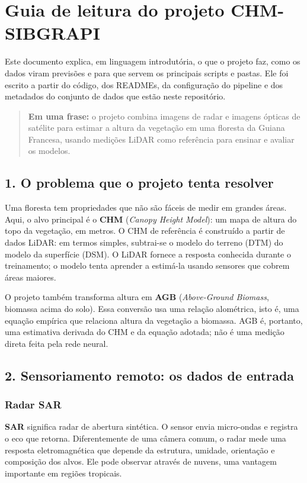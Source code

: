 \documentclass[11pt,a4paper]{article}
\begin{document}
\section{Guia de leitura do projeto CHM-SIBGRAPI}
Este documento explica, em linguagem introdutória, o que o projeto faz, como os dados viram previsões e para que servem os principais scripts e pastas. Ele foi escrito a partir do código, dos READMEs, da configuração do pipeline e dos metadados do conjunto de dados que estão neste repositório.

\begin{quote}\color{cinza}
\textbf{Em uma frase:} o projeto combina imagens de radar e imagens ópticas de satélite para estimar a altura da vegetação em uma floresta da Guiana Francesa, usando medições LiDAR como referência para ensinar e avaliar os modelos.\par
\end{quote}
\subsection{1. O problema que o projeto tenta resolver}
Uma floresta tem propriedades que não são fáceis de medir em grandes áreas. Aqui, o alvo principal é o \textbf{CHM} (\emph{Canopy Height Model}): um mapa de altura do topo da vegetação, em metros. O CHM de referência é construído a partir de dados LiDAR: em termos simples, subtrai-se o modelo do terreno (DTM) do modelo da superfície (DSM). O LiDAR fornece a resposta conhecida durante o treinamento; o modelo tenta aprender a estimá-la usando sensores que cobrem áreas maiores.

O projeto também transforma altura em \textbf{AGB} (\emph{Above-Ground Biomass}, biomassa acima do solo). Essa conversão usa uma relação alométrica, isto é, uma equação empírica que relaciona altura da vegetação a biomassa. AGB é, portanto, uma estimativa derivada do CHM e da equação adotada; não é uma medição direta feita pela rede neural.

\subsection{2. Sensoriamento remoto: os dados de entrada}
\subsubsection{Radar SAR}
\textbf{SAR} significa radar de abertura sintética. O sensor envia micro-ondas e registra o eco que retorna. Diferentemente de uma câmera comum, o radar mede uma resposta eletromagnética que depende da estrutura, umidade, orientação e composição dos alvos. Ele pode observar através de nuvens, uma vantagem importante em regiões tropicais.
\end{document}
